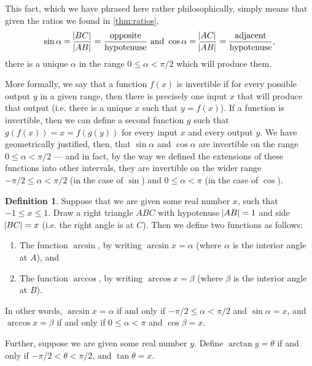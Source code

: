 \documentclass[a4paper,leqno]{article}
\numberwithin{equation}{section}
\theoremstyle{definition}
\newtheorem{defn}[equation]{Definition}
\theoremstyle{remark}
\begin{document}
This fact, which we have phrased here rather philosophically, simply means that given the ratios we found in \ref{thm:ratios},
\begin{equation}
      \sin \alpha = \frac{\abs{BC}}{\abs{AB}} = \frac{\text{opposite}}{\text{hypotenuse}} \text{ and }
      \cos \alpha = \frac{\abs{AC}}{\abs{AB}} = \frac{\text{adjacent}}{\text{hypotenuse}},
\end{equation}
there is a unique $ \alpha $ in the range $ 0 \leq \alpha < \pi/2 $ which will produce them.

More formally, we say that a function $ f(x) $ is invertible if for every possible output $ y $ in a given range, then there is precisely
one input $ x $ that will produce that output (i.e. there is a unique $ x $ such that $ y = f(x) $). If a function is invertible, then we
can define a second function $ g $ such that $ g(f(x)) = x = f(g(y)) $ for every input $ x $ and every output $ y $. We have geometrically justified, then,
that $ \sin \alpha $ and $ \cos \alpha $ are invertible on the range $ 0 \leq \alpha < \pi/2 $ --- and in fact, by the way we defined the
extensions of these functions into other intervals, they are invertible on the wider range $ -\pi/2 \leq \alpha < \pi/2 $ (in the case of $\sin$)
and $ 0 \leq \alpha < \pi $ (in the case of $\cos $).

\begin{defn}
  Suppose that we are given some real number $ x $, such that $ -1 \leq x \leq 1 $. Draw a right triangle $ ABC $ with hypotenuse $\abs{AB} = 1 $
  and side $ \abs{BC} = x $ (i.e. the right angle is at $ C $). Then we define two functions as follows:
  \begin{enumerate}
    \item The function $ \arcsin $, by writing $ \arcsin x = \alpha $ (where $ \alpha $ is the interior angle at $ A $), and
    \item The function $ \arccos $, by writing $ \arccos x = \beta $ (where $ \beta $ is the interior angle at $ B $).
  \end{enumerate}
  In other words, $ \arcsin x = \alpha $ if and only if $ -\pi/2 \leq \alpha < \pi/2 $ and $ \sin \alpha = x $, and $ \arccos x = \beta $ if
  and only if $ 0 \leq \alpha < \pi $ and $ \cos \beta = x $.

  Further, suppose we are given some real number $ y $. Define $ \arctan y = \theta $ if and only if $ -\pi/2 < \theta < \pi/2 $, and $ \tan \theta = x $.
\end{defn}
\end{document}
